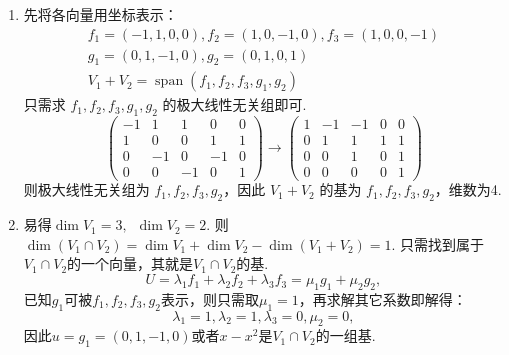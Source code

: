 \documentclass[12pt,fontset=fandol]{ctexart}
\begin{document}
\begin{solve}
\begin{enumerate}
                \item 先将各向量用坐标表示：
                      \begin{gather*}
                          f_1=(-1,1,0,0),f_2=(1,0,-1,0),f_3=(1,0,0,-1) \\
                          g_1=(0,1,-1,0),g_2=(0,1,0,1) \\
                          V_1+V_2=\operatorname{span}(f_1,f_2,f_3,g_1,g_2)
                      \end{gather*}
                      只需求 $f_1,f_2,f_3,g_1,g_2$ 的极大线性无关组即可.
                      \[\begin{pmatrix}
                              -1 & 1  & 1  & 0  & 0 \\
                              1  & 0  & 0  & 1  & 1 \\
                              0  & -1 & 0  & -1 & 0 \\
                              0  & 0  & -1 & 0  & 1
                          \end{pmatrix}\rightarrow
                          \begin{pmatrix}1 & -1 & -1 & 0 & 0 \\
                 0 & 1  & 1  & 1 & 1 \\
                 0 & 0  & 1  & 0 & 1 \\
                 0 & 0  & 0  & 0 & 1
                          \end{pmatrix}\]
                      则极大线性无关组为 $f_1,f_2,f_3,g_2$，因此 $V_1+V_2$ 的基为 $f_1,f_2,f_3,g_2$，维数为4.

                \item 易得$\dim V_1=3,\enspace \dim V_2=2$. 则$\dim (V_1\cap V_2)= \dim V_1+\dim V_2-\dim (V_1+V_2)=1$. 只需找到属于$V_1\cap V_2$的一个向量，其就是$V_1\cap V_2$的基.
                      \[U=\lambda_1f_1+\lambda_2f_2+\lambda_3f_3= \mu_1g_1+\mu_2g_2,\]
                      已知$g_1$可被$f_1,f_2,f_3,g_2$表示，则只需取$\mu_1=1$，再求解其它系数即解得：
                      \[\lambda_1=1,\lambda_2=1,\lambda_3=0,\mu_2=0,\]
                      因此$u=g_1=(0,1,-1,0)$或者$x-x^2$是$V_1\cap V_2$的一组基.


\end{enumerate}
\end{solve}
\end{document}
